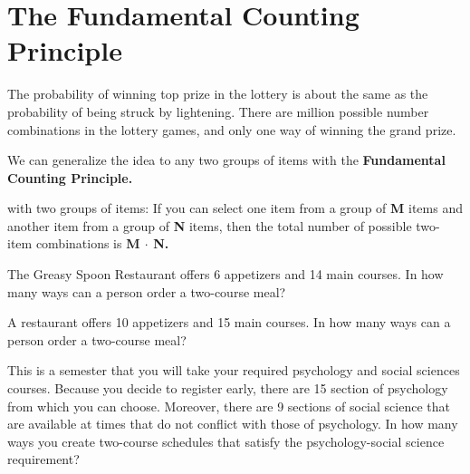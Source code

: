 \section{The Fundamental Counting Principle}
The probability of winning top prize in the lottery is about the same as the probability of being struck by lightening. There are million possible number combinations in the lottery games, and only one way of winning the grand prize.

	We can generalize the idea to any two groups of items with the {\bf Fundamental Counting Principle.}

\begin{tcolorbox}[enhanced,width=6.65in,center upper,size=fbox,drop shadow southwest,sharp corners]

\begin{tem} with two groups of items: If you can select one item from a group of {\bf M } items and another item from a group of {\bf N} items, then the total number of possible two-item combinations is {\bf M $\cdot$ N.}
\end{tem}
\end{tcolorbox}	

\begin{exe} The Greasy Spoon Restaurant offers 6 appetizers and 14 main courses. In how many ways can a person order a two-course meal?
\end{exe}
\vfill

\begin{ex} A restaurant offers 10 appetizers and 15 main courses. In how many ways can a person order a two-course meal?
\end{ex}
\vfill

\begin{ex} This is a semester that you will take your required psychology and social sciences courses. Because you decide to register early, there are 15 section of psychology from which you can choose. Moreover, there are 9 sections of social science that are available at times that do not conflict with those of psychology. In how many ways you create two-course schedules that satisfy the psychology-social science requirement?
\end{ex}
\vfill
\pagebreak

